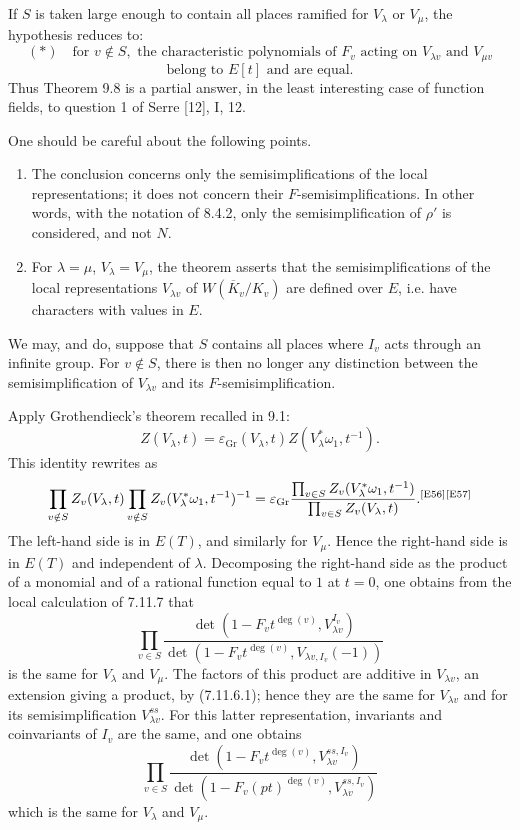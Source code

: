 \documentclass[10pt,letterpaper]{article}
\newcommand{\auditmark}[1]{\textsuperscript{\normalfont\scriptsize[E#1]}}
\begin{document}
If $S$ is taken large enough to contain all places ramified for $V_\lambda$ or $V_\mu$, the hypothesis reduces to:
\[
(*)\quad
\text{for }v\notin S,\text{ the characteristic polynomials of }F_v
\text{ acting on }V_{\lambda v}\text{ and }V_{\mu v}
\]
\[
\text{belong to }E[t]\text{ and are equal.}
\]
Thus Theorem 9.8 is a partial answer, in the least interesting case of function fields, to question 1 of Serre [12], I, 12.

One should be careful about the following points.
\begin{enumerate}[label=(\alph*)]
\item The conclusion concerns only the semisimplifications of the local representations; it does not concern their $F$-semisimplifications. In other words, with the notation of 8.4.2, only the semisimplification of $\rho'$ is considered, and not $N$.
\item For $\lambda=\mu$, $V_\lambda=V_\mu$, the theorem asserts that the semisimplifications of the local representations $V_{\lambda v}$ of $W(\overline K_v/K_v)$ are defined over $E$, i.e. have characters with values in $E$.
\end{enumerate}
We may, and do, suppose that $S$ contains all places where $I_v$ acts through an infinite group. For $v\notin S$, there is then no longer any distinction between the semisimplification of $V_{\lambda v}$ and its $F$-semisimplification.

Apply Grothendieck's theorem recalled in 9.1:
\[
Z(V_\lambda,t)=\varepsilon_{\mathrm{Gr}}(V_\lambda,t)Z(V_\lambda^*\omega_1,t^{-1}).
\]
This identity rewrites as
\[
\prod_{v\notin S}Z_v(V_\lambda,t)\prod_{v\notin S}Z_v(V_\lambda^*\omega_1,t^{-1})^{-1}
=
\varepsilon_{\mathrm{Gr}}
\frac{\prod_{v\in S}Z_v(V_\lambda^*\omega_1,t^{-1})}
{\prod_{v\in S}Z_v(V_\lambda,t)}.\auditmark{56}\auditmark{57}
\]
The left-hand side is in $E(T)$, and similarly for $V_\mu$. Hence the right-hand side is in $E(T)$ and independent of $\lambda$. Decomposing the right-hand side as the product of a monomial and of a rational function equal to $1$ at $t=0$, one obtains from the local calculation of 7.11.7 that
\[
\prod_{v\in S}
\frac{\det(1-F_vt^{\deg(v)},V_{\lambda v}^{I_v})}
{\det(1-F_vt^{\deg(v)},V_{\lambda v,I_v}(-1))}
\]
is the same for $V_\lambda$ and $V_\mu$. The factors of this product are additive in $V_{\lambda v}$, an extension giving a product, by (7.11.6.1); hence they are the same for $V_{\lambda v}$ and for its semisimplification $V_{\lambda v}^{ss}$. For this latter representation, invariants and coinvariants of $I_v$ are the same, and one obtains
\[
\tag{9.8.1}
\prod_{v\in S}
\frac{\det(1-F_vt^{\deg(v)},V_{\lambda v}^{ss,I_v})}
{\det(1-F_v(pt)^{\deg(v)},V_{\lambda v}^{ss,I_v})}
\]
which is the same for $V_\lambda$ and $V_\mu$.
\end{document}
